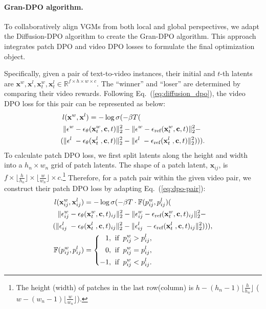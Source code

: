 \paragraph{Gran-DPO algorithm.} 

To collaboratively align VGMs from both local and global perspectives, we adapt the Diffusion-DPO algorithm to create the Gran-DPO algorithm. This approach integrates patch DPO and video DPO losses to formulate the final optimization object.

Specifically, given a pair of text-to-video instances, their initial and $t$-th latents are $\mathbf{x}^w, \mathbf{x}^l, \mathbf{x}^w_t, \mathbf{x}^l_t\in\mathbb{R}^{f\times h\times w\times c}$. The ``winner'' and ``loser'' are determined by comparing their video rewards. Following Eq.~(\ref{eq:diffusion_dpo}), the video DPO loss for this pair can be represented as below:
\begin{align}\small
     l(\mathbf{x}^w,\mathbf{x}^l) &= -\log \sigma(
    -\beta T( \nonumber\\
    \|\epsilon^w  -\epsilon_\theta&(\mathbf{x}^w_t,\mathbf{c},t) \|^2_2-
    \|\epsilon^w-\epsilon_{\text{ref}}(\mathbf{x}^w_t,\mathbf{c},t) \|^2_2-\nonumber\\
    (
    \|\epsilon^l\; -\epsilon_\theta&(\mathbf{x}^l_t\;,\mathbf{c},t) \|^2_2-
    \|\epsilon^l\;-\epsilon_{\text{ref}}(\mathbf{x}^l_t\;,\mathbf{c},t) \|^2_2
    )
    ) 
    ). 
    \label{eq:dpo-pair}
\end{align}
To calculate patch DPO loss, we first split latents along the height and width into a $h_n\times w_n$ grid of patch latents. The shape of a patch latent, $\mathbf{x}_{ij}$, is $f\times\lfloor \frac{h}{h_n}\rfloor\times\lfloor \frac{w}{w_n}\rfloor\times c$.\footnote{The height (width) of patches in the last row(column) is $h-(h_n-1)\lfloor\frac{h}{h_n}\rfloor$ ($w-(w_n-1)\lfloor\frac{w}{w_n}\rfloor$).} Therefore, for a patch pair within the given video pair, we construct their patch DPO loss by adapting Eq.~(\ref{eq:dpo-pair}):
\begin{align}\small
    l(\mathbf{x}^{w}_{ij},\mathbf{x}^{l}_{ij}) &= -\log \sigma(
    -\beta T \cdot \mathbb{F}(p^{w}_{ij},p^{l}_{ij})( \nonumber\\
    \|\epsilon^{w}_{ij}  -\epsilon_\theta&(\mathbf{x}^w_t,\mathbf{c},t)_{ij} \|^2_2-
    \|\epsilon^{w}_{ij}-\epsilon_{\text{ref}}(\mathbf{x}^w_t,\mathbf{c},t)_{ij} \|^2_2-\nonumber\\
    (
    \|\epsilon^l_{ij}\; -\epsilon_\theta&(\mathbf{x}^l_t\;,\mathbf{c},t)_{ij} \|^2_2-
    \|\epsilon^l_{ij}\;-\epsilon_{\text{ref}}(\mathbf{x}^l_t\;,\mathbf{c},t)_{ij} \|^2_2
    )
    ) 
    ), \nonumber\\
    \mathbb{F}(p^{w}_{ij},p^{l}_{ij}) &= \left\{
        \begin{aligned}
            1, & \;\;\text{if}\;\; p^{w}_{ij} > p^{l}_{ij},\\
            0, & \;\;\text{if}\;\; p^{w}_{ij} = p^{l}_{ij},\\
           -1, & \;\;\text{if}\;\; p^{w}_{ij} < p^{l}_{ij}.
        \end{aligned}
        \right.
\end{align}

